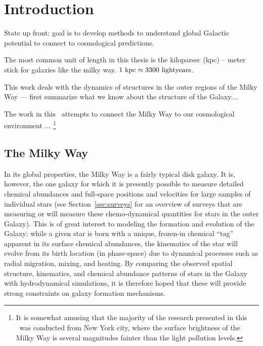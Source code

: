 \chapter[Introduction]{Introduction}
\label{ch:intro}


State up front: goal is to develop methods to understand global Galactic potential to connect to cosmological predictions.

The most common unit of length in this thesis is the kiloparsec (kpc) -- meter stick for galaxies like the milky way. $1~\mathrm{kpc} \approx 3300~{\rm light years}$.

This work deals with the dynamics of structures in the outer regions of the Milky Way --- first summarize what we know about the structure of the Galaxy....

The work in this \article\ attempts to connect the Milky Way to our cosmological environment ... \footnote{It is somewhat amusing that the majority of the research presented in this \article\ was conducted from New York city, where the surface brightness of the Milky Way is several magnitudes fainter than the light pollution levels.}

\section{The Milky Way}\label{sec:milkyway}

In its global properties, the Milky Way is a fairly typical disk galaxy. It is, however, the one galaxy for which it is presently possible to measure detailed chemical abundances and full-space positions and velocities for large samples of individual stars (see Section~\ref{sec:surveys} for an overview of surveys that are measuring or will measure these chemo-dynamical quantities for stars in the outer Galaxy). This is of great interest to modeling the formation and evolution of the Galaxy: while a given star is born with a unique, frozen-in chemical ``tag'' apparent in its surface chemical abundances, the kinematics of the star will evolve from its birth location (in phase-space) due to dynamical processes such as radial migration, mixing, and heating. By comparing the observed spatial structure, kinematics, and chemical abundance patterns of stars in the Galaxy with hydrodynamical simulations, it is therefore hoped that these will provide strong constraints on galaxy formation mechanisms. 

